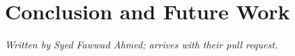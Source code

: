 \section{Conclusion and Future Work}
\label{sec:conclusion}

\emph{Written by Syed Fawwad Ahmed; arrives with their pull request.}
